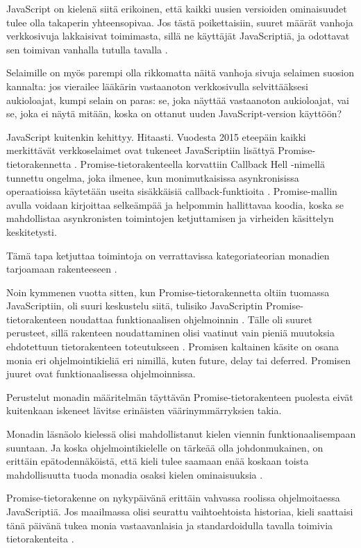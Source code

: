 JavaScript on kielenä siitä erikoinen, että kaikki uusien versioiden ominaisuudet tulee olla takaperin yhteensopivaa. Jos tästä poikettaisiin, suuret määrät vanhoja verkkosivuja lakkaisivat toimimasta, sillä ne käyttäjät JavaScriptiä, ja odottavat sen toimivan vanhalla tutulla tavalla \cite{prototype_library_trends}.

Selaimille on myös parempi olla rikkomatta näitä vanhoja sivuja selaimen suosion kannalta: jos vierailee lääkärin vastaanoton verkkosivulla selvittääksesi aukioloajat, kumpi selain on paras: se, joka näyttää vastaanoton aukioloajat, vai se, joka ei näytä mitään, koska on ottanut uuden JavaScript-version käyttöön? \citep{against_self_closing_tags,proposal-joint-iteration}

JavaScript kuitenkin kehittyy. Hitaasti. Vuodesta 2015 eteepäin kaikki merkittävät verkkoselaimet ovat tukeneet JavaScriptiin lisättyä Promise-tietorakennetta \cite{mdn_promise}. Promise-tietorakenteella korvattiin Callback Hell -nimellä tunnettu ongelma, joka ilmenee, kun monimutkaisissa asynkronisissa operaatioissa käytetään useita sisäkkäisiä callback-funktioita \cite{callbackhell}. Promise-mallin avulla voidaan kirjoittaa selkeämpää ja helpommin hallittavaa koodia, koska se mahdollistaa asynkronisten toimintojen ketjuttamisen ja virheiden käsittelyn keskitetysti.

Tämä tapa ketjuttaa toimintoja on verrattavissa kategoriateorian monadien tarjoamaan rakenteeseen \cite{promises-spec-94,stackoverflow:why_monad}.

Noin kymmenen vuotta sitten, kun Promise-tietorakennetta oltiin tuomassa JavaScriptiin, oli suuri keskustelu siitä, tulisiko JavaScriptin Promise-tietorakenteen noudattaa funktionaalisen ohjelmoinnin . Tälle oli suuret perusteet, sillä rakenteen noudattaminen olisi vaatinut vain pieniä muutoksia ehdotettuun tietorakenteen toteutukseen \cite{promises-spec-94}. Promisen kaltainen käsite on osana monia eri ohjelmointikieliä eri nimillä, kuten future, delay tai deferred. Promisen juuret ovat funktionaalisessa ohjelmoinnissa.

Perustelut monadin määritelmän täyttävän Promise-tietorakenteen puolesta eivät kuitenkaan iskeneet lävitse erinäisten väärinymmärryksien takia.

Monadin läsnäolo kielessä olisi mahdollistanut kielen viennin funktionaalisempaan suuntaan. Ja koska ohjelmointikielelle on tärkeää olla johdonmukainen, on erittäin epätodennäköistä, että kieli tulee saamaan enää koskaan toista mahdollisuutta tuoda monadia osaksi kielen ominaisuuksia \cite{proposal-joint-iteration,prototype_library_trends}.

Promise-tietorakenne on nykypäivänä erittäin vahvassa roolissa ohjelmoitaessa JavaScriptiä. Jos maailmassa olisi seurattu vaihtoehtoista historiaa, kieli saattaisi tänä päivänä tukea monia vastaavanlaisia ja standardoidulla tavalla toimivia tietorakenteita \cite{promises-spec-94}.
